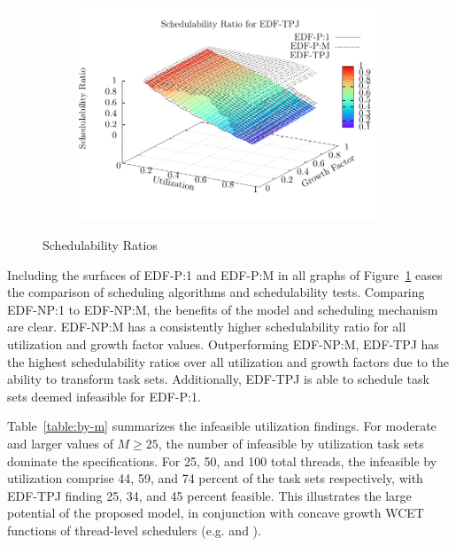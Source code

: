 \begin{figure}[hb]
\begin{subfigure}[t]{.32\linewidth}
  \end{subfigure}~
  \begin{subfigure}[t]{.32\linewidth}
    \includegraphics[width=\linewidth]{plot/avg-alg-sched/avg-ratio-TPJ-i}
  \end{subfigure}
  \caption{Schedulability Ratios}
  \label{fig:eval-summary}
\end{figure}

Including the surfaces of EDF-P:1 and EDF-P:M in all graphs of
Figure~\ref{fig:eval-summary} eases the comparison of scheduling
algorithms and schedulability tests. Comparing EDF-NP:1 
to EDF-NP:M, the benefits of the model and scheduling mechanism are
clear. EDF-NP:M has a consistently higher schedulability ratio for all
utilization and growth factor values. Outperforming
EDF-NP:M, EDF-TPJ has the highest schedulability ratios
over all utilization and growth factors due to the ability to
transform task sets. Additionally, EDF-TPJ is able to schedule task
sets deemed infeasible for EDF-P:1.

Table~\ref{table:by-m} summarizes the infeasible utilization
findings. For moderate and larger values of ${M \ge 25}$, the number
of infeasible by utilization task sets dominate the
specifications. For 25, 50, and 100 total threads, the infeasible by
utilization comprise 44, 59, and 74 percent of the task sets
respectively, with EDF-TPJ finding 25, 34, and 45 percent
feasible. This illustrates the large potential of the proposed model,
in conjunction with concave growth WCET functions of
thread-level schedulers (e.g. \bundle{} and \bundlep{}).

\begin{table}
  \centering
  
\end{table}

